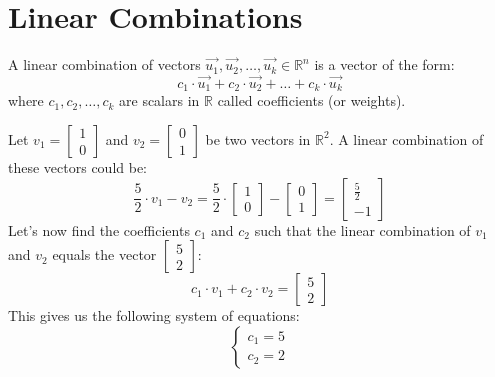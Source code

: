 
\section{Linear Combinations}
\begin{definition}
    A linear combination of vectors $\vec{u_1}, \vec{u_2}, \ldots, \vec{u_k} \in \mathbb{R}^n$ is a vector of the form:
    \[
    c_1 \cdot \vec{u_1} + c_2 \cdot \vec{u_2} + \ldots + c_k \cdot \vec{u_k}
    \]
    where $c_1, c_2, \ldots, c_k$ are scalars in $\mathbb{R}$ called coefficients (or weights).
\end{definition}

\begin{eg}
    Let $v_1 = \begin{bmatrix} 1 \\ 0 \end{bmatrix}$ and $v_2 = \begin{bmatrix} 0 \\ 1 \end{bmatrix}$ be two vectors in $\mathbb{R}^2$. A linear combination of these vectors could be:
    \[
    \frac{5}{2} \cdot v_1 - v_2 = \frac{5}{2} \cdot \begin{bmatrix} 1 \\ 0 \end{bmatrix} -  \begin{bmatrix} 0 \\ 1 \end{bmatrix} = \begin{bmatrix} \frac{5}{2} \\ -1 \end{bmatrix}
    \]
    Let's now find the coefficients $c_1$ and $c_2$ such that the linear combination of $v_1$ and $v_2$ equals the vector $\begin{bmatrix} 5 \\ 2 \end{bmatrix}$:
    \[
    c_1 \cdot v_1 + c_2 \cdot v_2 = \begin{bmatrix} 5 \\ 2 \end{bmatrix}
    \]
    This gives us the following system of equations:
    \[
    \begin{cases}
    c_1 = 5 \\
    c_2 = 2
    \end{cases}
    \]
\end{eg}

